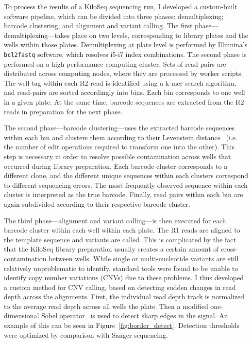 To process the results of a KiloSeq sequencing run, I developed a custom-built software pipeline, which can be divided into three phases: demultiplexing; barcode clustering; and alignment and variant calling.
The first phase---demultiplexing---takes place on two levels, corresponding to library plates and the wells within those plates. Demultiplexing at plate level is performed by Illumina's \texttt{bcl2fastq} software, which resolves i5-i7 index combinations. The second phase is performed on a high performance computing cluster. Sets of read pairs are distributed across computing nodes, where they are processed by worker scripts. The well-tag within each R2 read is identified using a k-mer search algorithm, and read-pairs are sorted accordingly into bins. Each bin corresponds to one well in a given plate. At the same time, barcode sequences are extracted from the R2 reads in preparation for the next phase. 

The second phase---barcode clustering---uses the extracted barcode sequences within each bin and clusters them according to their Levenstein distance~\cite{levenshtein_binary_1966} (i.e. the number of edit operations required to transform one into the other). This step is necessary in order to resolve possible contamination across wells that occurred during library preparation. Each barcode cluster corresponds to a different clone, and the different unique sequences within each clusters correspond to different sequencing errors. The most frequently observed sequence within each cluster is interpreted as the true barcode. Finally, read pairs within each bin are again subdivided according to their respective barcode cluster.

The third phase---alignment and variant calling---is then executed for each barcode cluster within each well within each plate. The R1 reads are aligned to the template sequence and variants are called. This is complicated by the fact that the KiloSeq library preparation usually creates a certain amount of cross-contamination between wells. While single or multi-nucleotide variants are still relatively unproblematic to identify, standard tools were found to be unable to identify copy number variations (CNVs) due to these problems. I thus developed a custom method for CNV calling, based on detecting sudden changes in read depth across the alignments. First, the individual read depth track is normalized to the average read depth across all wells the plate. Then a modified one-dimensional Sobel operator~\cite{sobel_3x3_1968} is used to detect sharp edges in the signal. An example of this can be seen in Figure~\ref{fig:border_detect}. Detection thresholds were optimized by comparison with Sanger sequencing.

